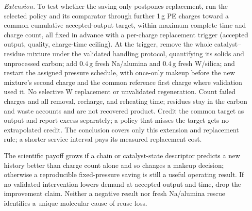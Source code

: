 \emph{Extension.} To test whether the saving only postpones replacement, run the selected policy and its comparator through further 1\,g PE charges toward a common cumulative accepted-output target, within maximum complete time and charge count, all fixed in advance with a per-charge replacement trigger (accepted output, quality, charge-time ceiling). At the trigger, remove the whole catalyst--residue mixture under the validated handling protocol, quantifying its solids and unprocessed carbon; add 0.4\,g fresh Na/alumina and 0.4\,g fresh W/silica; and restart the assigned pressure schedule, with once-only makeup before the new mixture's second charge and the common reference first charge where validation used it. No selective W replacement or unvalidated regeneration. Count failed charges and all removal, recharge, and reheating time; residues stay in the carbon and waste accounts and are not recovered product. Credit the common target as output and report excess separately; a policy that misses the target gets no extrapolated credit. The conclusion covers only this extension and replacement rule; a shorter service interval pays its measured replacement cost.

The scientific payoff grows if a chain or catalyst-state descriptor predicts a new history better than charge count alone and so changes a makeup decision; otherwise a reproducible fixed-pressure saving is still a useful operating result. If no validated intervention lowers demand at accepted output and time, drop the improvement claim. Neither a negative result nor fresh Na/alumina rescue identifies a unique molecular cause of reuse loss.
